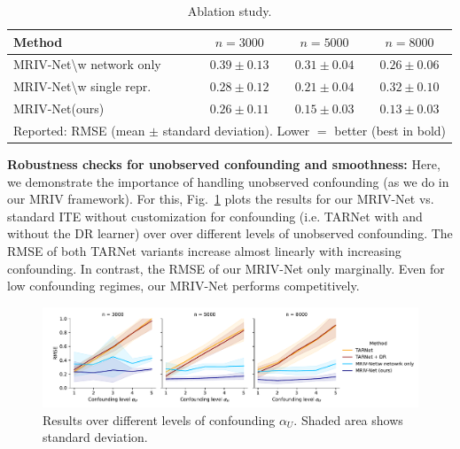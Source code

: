 \documentclass[nonatbib]{article}
\newcommand{\frameworkname}{MRIV\xspace}
\newcommand{\modelname}{\mbox{MRIV-Net}\xspace}
\theoremstyle{definition}
\theoremstyle{plain}
\begin{document}
\begin{table}[tbp]
\vspace{-0.5cm}
\caption{Ablation study.}
\label{tab:ablation}
\centering
\vspace{-0.3cm}
\label{t:results_sim}
\scriptsize
\begin{tabular}{lccc}
\noalign{\smallskip} \toprule \noalign{\smallskip}
{Method} & {$n = 3000$} & {$n = 5000$} & {$n = 8000$} \\
\midrule
\modelname {\textbackslash}w network only &$0.39 \pm 0.13$ & $0.31 \pm 0.04$ &
$0.26 \pm 0.06$\\
\modelname {\textbackslash}w single repr. &$0.28 \pm 0.12$ & $0.21 \pm 0.04$ &
$0.32 \pm 0.10$\\
\modelname (ours) &$\boldsymbol{0.26 \pm 0.11}$ & $\boldsymbol{0.15 \pm 0.03}$ &
$\boldsymbol{0.13 \pm 0.03}$\\
\bottomrule
\multicolumn{4}{l}{Reported: RMSE (mean $\pm$ standard deviation). Lower $=$ better (best in bold)}
\end{tabular}
\vspace{-0.3cm}
\end{table}

 
\textbf{Robustness checks for unobserved confounding and smoothness:} Here, we demonstrate the importance of handling unobserved confounding (as we do in our \frameworkname framework). For this, Fig.~\ref{fig:plt_confounding} plots the results for our \modelname vs. standard ITE without customization for confounding (i.e. TARNet with and without the DR learner) over over different levels of unobserved confounding. The RMSE of both TARNet variants increase almost linearly with increasing confounding. In contrast, the RMSE of our \modelname only marginally. Even for low confounding regimes, our \modelname performs competitively. 

\begin{figure}[h]
\vspace{-0.3cm}
\centering
\includegraphics[width=0.8\linewidth]{img/plot_confounding.pdf}
\caption{Results over different levels of confounding $\alpha_U$. Shaded area shows standard deviation.}
\label{fig:plt_confounding}
\vspace{-0.3cm}
\end{figure}
\end{document}
